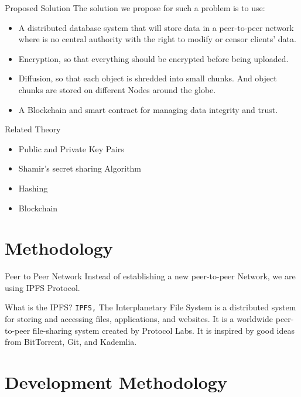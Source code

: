 \documentclass[aspectratio=169,usenames,dvipsnames,pdftex]{beamer}
\begin{document}
  \begin{frame}{Proposed Solution}
    The solution we propose for such a problem is to use:
    \begin{itemize}
    \item \textcolor{green}{\faCheckCircle{}} A distributed database system that will store data in a peer-to-peer network where is no central authority with the right to modify or censor clients' data.
    \item \textcolor{green}{\faCheckCircle{}} Encryption, so that everything should be encrypted before being uploaded.
    \item \textcolor{green}{\faCheckCircle{}} Diffusion, so that each object is shredded into small chunks. And object chunks are stored on different Nodes around the globe.
    \item \textcolor{green}{\faCheckCircle{}} A Blockchain and smart contract for managing data integrity and trust.
    \end{itemize}
  \end{frame}

  \begin{frame}{Related Theory}
    \begin{itemize}
    \item Public and Private Key Pairs
    \item Shamir’s secret sharing Algorithm
    \item Hashing
    \item Blockchain
    \end{itemize}
  \end{frame}

  \section{Methodology}

  \begin{frame}{Peer to Peer Network}
    Instead of establishing a new peer-to-peer Network, we are using IPFS Protocol.
    \begin{block}{What is the IPFS?}
      \texttt{IPFS,} The Interplanetary File System is a distributed system for storing and accessing files, applications, and websites. It is a worldwide peer-to-peer file-sharing system created by Protocol Labs.  It is inspired by good ideas from BitTorrent, Git, and Kademlia.
    \end{block}
  \end{frame}

  \section{Development Methodology}
\end{document}
